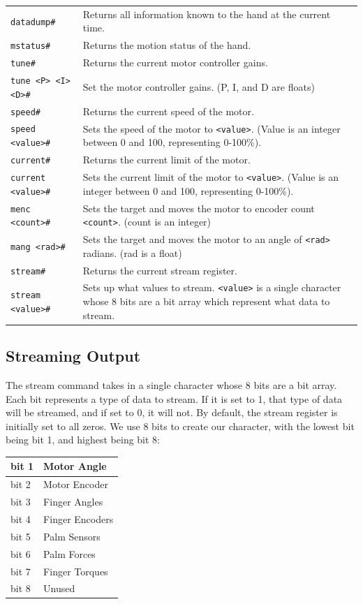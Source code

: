 \documentclass[letterpaper,notitlepage,10pt]{article}
\begin{document}
\begin{tabular}{l|p{}}
\verb;datadump#; & Returns all information known to the hand at the current time. \\
\verb;mstatus#; & Returns the motion status of the hand. \\
\verb;tune#; & Returns the current motor controller gains. \\
\verb;tune <P> <I> <D>#; &Set the motor controller gains. (P, I, and D are floats)\\
\verb;speed#; & Returns the current speed of the motor. \\
\verb;speed <value>#; & Sets the speed of the motor to \verb;<value>;. (Value is an integer between 0 and 100, representing 0-100\%). \\
\verb;current#; & Returns the current limit of the motor. \\
\verb;current <value>#; & Sets the current limit of the motor to \verb;<value>;. (Value is an integer between 0 and 100, representing 0-100\%). \\
\verb;menc <count>#; & Sets the target and moves the motor to encoder count \verb;<count>;. (count is an integer)\\
\verb;mang <rad>#; & Sets the target and moves the motor to an angle of \verb;<rad>; radians. (rad is a float)\\
\verb;stream#; & Returns the current stream register. \\
\verb;stream <value>#; & Sets up what values to stream. \verb;<value>; is a single character whose 8 bits are a bit array which represent what data to stream. \\


\end{tabular}

\subsection{Streaming Output}
The stream command takes in a single character whose 8 bits are a bit array. Each bit represents a type of data to stream. If it is set to 1, that type of data will be streamed, and if set to 0, it will not. By default, the stream register is initially set to all zeros. We use 8 bits to create our character, with the lowest bit being bit 1, and highest being bit 8:\\

\begin{tabular}{|l|l|}
\hline
bit 1 & Motor Angle \\ \hline
bit 2 & Motor Encoder \\ \hline
bit 3 & Finger Angles \\ \hline
bit 4 & Finger Encoders \\ \hline
bit 5 & Palm Sensors \\ \hline
bit 6 & Palm Forces \\ \hline
bit 7 & Finger Torques \\\hline
bit 8 & Unused \\ \hline
\end{tabular}\\
\end{document}
